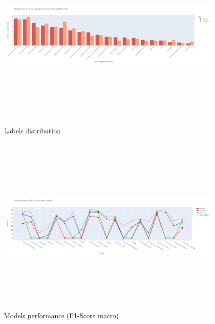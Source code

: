 \documentclass[11pt]{article}
\begin{document}
\begin{figure}
	\centering
	\includegraphics[width=1.\textheight, height=9cm]{figures/label_dist.png}
	\caption{Labels distribution}
	    \label{fig:labels_dist}
	\centering
	\includegraphics[width=1.\textheight, height=9cm]{figures/models_performance.png}
	\caption{Models performance (F1-Score macro)}
	    \label{fig:models_performance}
\end{figure}






\end{document}
